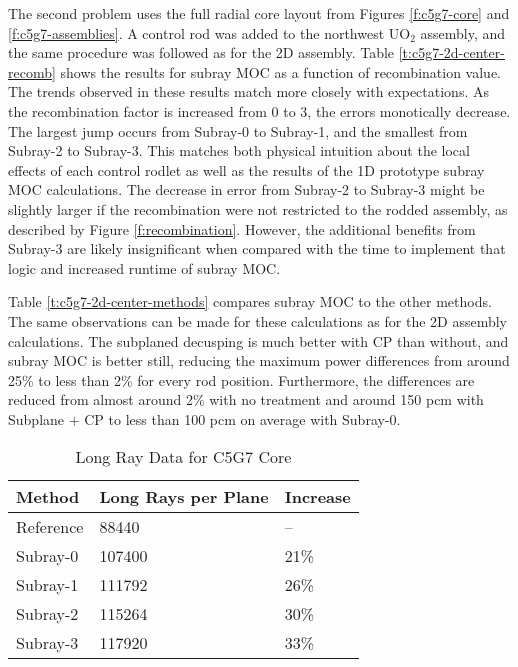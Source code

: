 The second problem uses the full radial core layout from Figures \ref{f:c5g7-core} and \ref{f:c5g7-assemblies}.  A control rod was added to the northwest UO$_2$ assembly, and the same procedure was followed as for the 2D assembly.  Table \ref{t:c5g7-2d-center-recomb} shows the results for subray MOC as a function of recombination value.  The trends observed in these results match more closely with expectations.  As the recombination factor is increased from 0 to 3, the errors monotically decrease.  The largest jump occurs from Subray-0 to Subray-1, and the smallest from Subray-2 to Subray-3.  This matches both physical intuition about the local effects of each control rodlet as well as the results of the 1D prototype subray MOC calculations.  The decrease in error from Subray-2 to Subray-3 might be slightly larger if the recombination were not restricted to the rodded assembly, as described by Figure \ref{f:recombination}.  However, the additional benefits from Subray-3 are likely insignificant when compared with the time to implement that logic and increased runtime of subray MOC.

Table \ref{t:c5g7-2d-center-methods} compares subray MOC to the other methods. The same observations can be made for these calculations as for the 2D assembly calculations.  The subplaned decusping is much better with CP than without, and subray MOC is better still, reducing the maximum power differences from around 25\% to less than 2\% for every rod position.  Furthermore, the \keff{} differences are reduced from almost around 2\% with no treatment and around 150 pcm with Subplane + CP to less than 100 pcm on average with Subray-0.

\begin{table}[h]
    \centering
    \caption{Long Ray Data for C5G7 Core}\label{t:subray-data-2dcore}
    \begin{tabular}{l l l }\toprule
        Method & Long Rays per Plane & Increase \\\midrule
        Reference & 88440 & -- \\
        Subray-0 & 107400 & 21\% \\
        Subray-1 & 111792 & 26\% \\
        Subray-2 & 115264 & 30\% \\
        Subray-3 & 117920 & 33\% \\
        \bottomrule
    \end{tabular}
\end{table}

